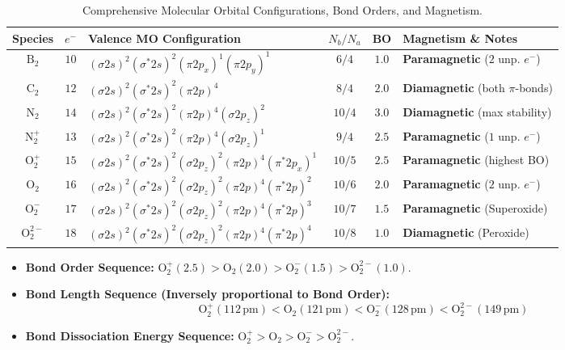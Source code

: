 \documentclass[10pt,twoside,openright]{book}
\begin{document}
\begin{table}[htbp]
\centering
\footnotesize
\renewcommand{\arraystretch}{1.25}
{\fontsize{7.5pt}{9.0pt}\selectfont\setlength{\tabcolsep}{1.5pt}
\begin{tabularx}{\linewidth}{c c >{\hsize}L c c >{\hsize}L}
\toprule
\textbf{Species} & \textbf{$e^-$} & \textbf{Valence MO Configuration} & $N_b/N_a$ & \textbf{BO} & \textbf{Magnetism \& Notes} \\
\midrule
$\mathrm{B_2}$ & $10$ & $(\sigma 2s)^2 (\sigma^* 2s)^2 (\pi 2p_x)^1 (\pi 2p_y)^1$ & $6/4$ & $1.0$ & \textbf{Paramagnetic} ($2$ unp. $e^-$) \\
$\mathrm{C_2}$ & $12$ & $(\sigma 2s)^2 (\sigma^* 2s)^2 (\pi 2p)^4$ & $8/4$ & $2.0$ & \textbf{Diamagnetic} (both $\pi$-bonds) \\
$\mathrm{N_2}$ & $14$ & $(\sigma 2s)^2 (\sigma^* 2s)^2 (\pi 2p)^4 (\sigma 2p_z)^2$ & $10/4$ & $3.0$ & \textbf{Diamagnetic} (max stability) \\
$\mathrm{N_2^+}$ & $13$ & $(\sigma 2s)^2 (\sigma^* 2s)^2 (\pi 2p)^4 (\sigma 2p_z)^1$ & $9/4$ & $2.5$ & \textbf{Paramagnetic} ($1$ unp. $e^-$) \\
$\mathrm{O_2^+}$ & $15$ & $(\sigma 2s)^2 (\sigma^* 2s)^2 (\sigma 2p_z)^2 (\pi 2p)^4 (\pi^* 2p_x)^1$ & $10/5$ & $2.5$ & \textbf{Paramagnetic} (highest BO) \\
$\mathrm{O_2}$ & $16$ & $(\sigma 2s)^2 (\sigma^* 2s)^2 (\sigma 2p_z)^2 (\pi 2p)^4 (\pi^* 2p)^2$ & $10/6$ & $2.0$ & \textbf{Paramagnetic} ($2$ unp. $e^-$) \\
$\mathrm{O_2^-}$ & $17$ & $(\sigma 2s)^2 (\sigma^* 2s)^2 (\sigma 2p_z)^2 (\pi 2p)^4 (\pi^* 2p)^3$ & $10/7$ & $1.5$ & \textbf{Paramagnetic} (Superoxide) \\
$\mathrm{O_2^{2-}}$ & $18$ & $(\sigma 2s)^2 (\sigma^* 2s)^2 (\sigma 2p_z)^2 (\pi 2p)^4 (\pi^* 2p)^4$ & $10/8$ & $1.0$ & \textbf{Diamagnetic} (Peroxide) \\
\bottomrule
\end{tabularx}}
\caption{Comprehensive Molecular Orbital Configurations, Bond Orders, and Magnetism.}
\end{table}

\begin{ncertbox}
\begin{itemize}
  \item \textbf{Bond Order Sequence:} $\mathrm{O_2^+ (2.5) > O_2 (2.0) > O_2^- (1.5) > O_2^{2-} (1.0)}$.
  \item \textbf{Bond Length Sequence (Inversely proportional to Bond Order):}
  \begin{equation}
    \mathbf{\mathrm{O_2^+ (112\,pm) < O_2 (121\,pm) < O_2^- (128\,pm) < O_2^{2-} (149\,pm)}}
  \end{equation}
  \item \textbf{Bond Dissociation Energy Sequence:} $\mathrm{O_2^+ > O_2 > O_2^- > O_2^{2-}}$.
\end{itemize}
\end{ncertbox}
\end{document}
